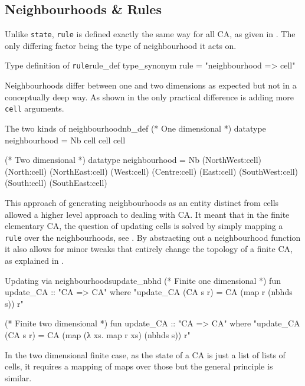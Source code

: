 \subsection{Neighbourhoods \& Rules}

Unlike \texttt{state},
\texttt{rule} is defined exactly the same way for all CA, as given in .
The only differing factor being the type of neighbourhood it acts on.

\begin{myminted}{Type definition of \texttt{rule}}{rule_def}
    type_synonym rule = "neighbourhood => cell"
\end{myminted}

Neighbourhoods differ between one and two dimensions as expected but not in a conceptually deep way.
As shown in  the only practical difference is adding more \texttt{cell} arguments.

\begin{myminted}{The two kinds of neighbourhood}{nb_def}
    (* One dimensional *)
    datatype neighbourhood = Nb cell cell cell

    (* Two dimensional *)
    datatype neighbourhood = Nb
    (NorthWest:cell) (North:cell)  (NorthEast:cell)
    (West:cell)      (Centre:cell) (East:cell)
    (SouthWest:cell) (South:cell)  (SouthEast:cell)
\end{myminted}

This approach of generating neighbourhoods as an entity distinct from cells allowed a higher level approach to dealing with CA.
It meant that in the finite elementary CA,
the question of updating cells is solved by simply mapping a \texttt{rule} over the neighbourhoods,
see .
By abstracting out a neighbourhood function it also allows for minor tweaks that entirely change the topology of a finite CA,
as explained in .


\begin{myminted}{Updating via neighbourhoods}{update_nbhd}
    (* Finite one dimensional *)
    fun update_CA :: "CA => CA" where
    "update_CA (CA s r) = CA (map r (nbhds s)) r"

    (* Finite two dimensional *)
    fun update_CA :: "CA => CA" where
    "update_CA (CA s r) = CA (map (λ xs. map r xs) (nbhds s)) r"
\end{myminted}

In the two dimensional finite case,
as the state of a CA is just a list of lists of cells,
it requires a mapping of maps over those but the general principle is similar.

